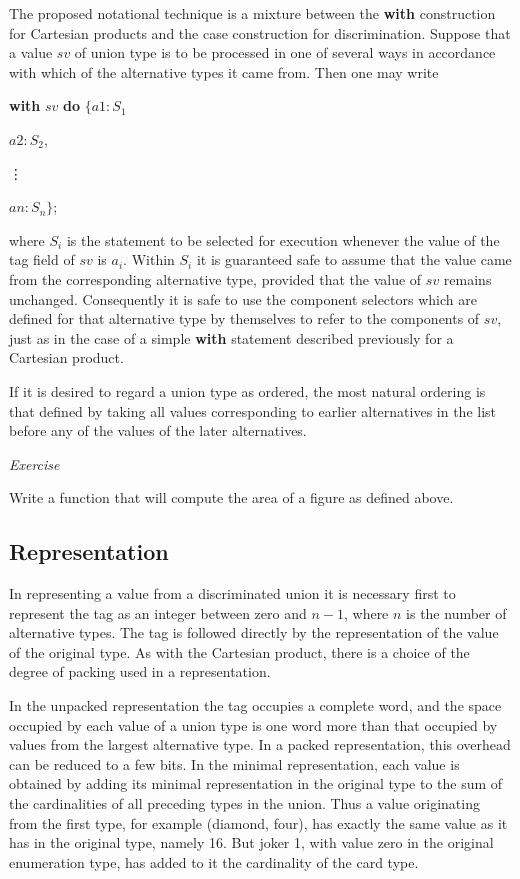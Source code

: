 The proposed notational technique is a mixture between the \textbf{with} construction for Cartesian products and the case construction for discrimination. Suppose that a value $sv$ of union type is to be processed in one of several ways in accordance with which of the alternative types it came from. Then one may write

\quad \textbf{with} $sv$ \textbf{do} $\{a1:S_1$

\tabto*{7.6em}$a2:S_2$,
\smallskip

\tabto*{8.85em}\vdots

\tabto*{7.6em}$an:S_n\}$;

\noindent
where $S_i$ is the statement to be selected for execution whenever the value of the tag field of $sv$ is $a_i$. Within $S_i$ it is guaranteed safe to assume that the value came from the corresponding alternative type, provided that the value of $sv$ remains unchanged. Consequently it is safe to use the component selectors which are defined for that alternative type by themselves to refer to the components of $sv$, just as in the case of a simple \textbf{with} statement described previously for a Cartesian product.

If it is desired to regard a union type as ordered, the most natural ordering is that defined by taking all values corresponding to earlier alternatives in the list before any of the values of the later alternatives.

\noindent
\textit{Exercise}
\nopagebreak

\noindent
Write a function that will compute the area of a figure as defined above.

\subsection{Representation}

In representing a value from a discriminated union it is necessary first to represent the tag as an integer between zero and $n - 1$, where $n$ is the number of alternative types. The tag is followed directly by the representation of the value of the original type. As with the Cartesian product, there is a choice of the degree of packing used in a representation.

In the unpacked representation the tag occupies a complete word, and the space occupied by each value of a union type is one word more than that occupied by values from the largest alternative type. In a packed representation, this overhead can be reduced to a few bits. In the minimal representation, each value is obtained by adding its minimal representation in the original type to the sum of the cardinalities of all preceding types in the union. Thus a value originating from the first type, for example (diamond, four), has exactly the same value as it has in the original type, namely 16. But joker 1, with value zero in the original enumeration type, has added to it the cardinality of the card type.

